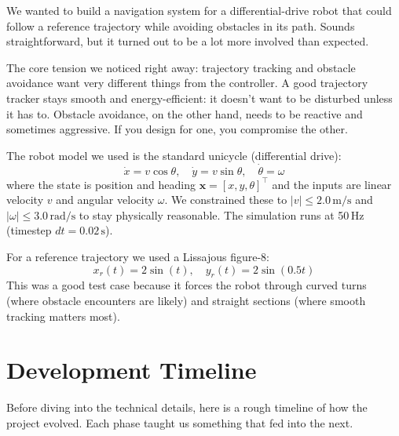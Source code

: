 \documentclass[12pt,a4paper]{article}
\begin{document}
We wanted to build a navigation system for a differential-drive robot that
could follow a reference trajectory while avoiding obstacles in its path.
Sounds straightforward, but it turned out to be a lot more involved than
expected.

The core tension we noticed right away: trajectory tracking and obstacle
avoidance want very different things from the controller. A good trajectory
tracker stays smooth and energy-efficient: it doesn't want to be
disturbed unless it has to. Obstacle avoidance, on the other hand, needs to
be reactive and sometimes aggressive. If you design for one, you compromise
the other.

The robot model we used is the standard unicycle (differential drive):
\begin{equation}
  \dot{x} = v\cos\theta, \quad \dot{y} = v\sin\theta, \quad \dot{\theta} = \omega
\end{equation}
where the state is position and heading $\mathbf{x} = [x, y, \theta]^\top$
and the inputs are linear velocity $v$ and angular velocity $\omega$. We
constrained these to $|v| \leq 2.0\,\text{m/s}$ and
$|\omega| \leq 3.0\,\text{rad/s}$ to stay physically reasonable. The
simulation runs at 50\,Hz (timestep $dt = 0.02\,\text{s}$).

For a reference trajectory we used a Lissajous figure-8:
\[
  x_r(t) = 2\sin(t), \quad y_r(t) = 2\sin(0.5t)
\]
This was a good test case because it forces the robot through curved turns
(where obstacle encounters are likely) and straight sections (where smooth
tracking matters most).

\section{Development Timeline}

Before diving into the technical details, here is a rough timeline of how
the project evolved. Each phase taught us something that fed into the next.
\end{document}
